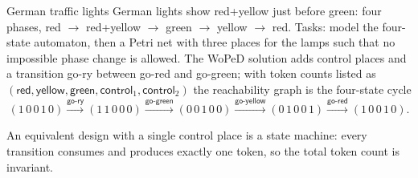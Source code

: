 \begin{examplebox}{German traffic lights}
German lights show \textsf{red+yellow} just before \textsf{green}: four phases, \textsf{red} $\to$ \textsf{red+yellow} $\to$ \textsf{green} $\to$ \textsf{yellow} $\to$ \textsf{red}. Tasks: model the four-state automaton, then a Petri net with three places for the lamps such that no impossible phase change is allowed. The WoPeD solution adds control places and a transition \textsf{go-ry} between \textsf{go-red} and \textsf{go-green}; with token counts listed as $(\textsf{red}, \textsf{yellow}, \textsf{green}, \textsf{control}_1, \textsf{control}_2)$ the reachability graph is the four-state cycle
\[
  (1\,0\,0\,1\,0) \xrightarrow{\textsf{go-ry}} (1\,1\,0\,0\,0) \xrightarrow{\textsf{go-green}} (0\,0\,1\,0\,0) \xrightarrow{\textsf{go-yellow}} (0\,1\,0\,0\,1) \xrightarrow{\textsf{go-red}} (1\,0\,0\,1\,0).
\]
\begin{center}
\end{center}
An equivalent design with a single control place is a state machine: every transition consumes and produces exactly one token, so the total token count is invariant.
\end{examplebox}


